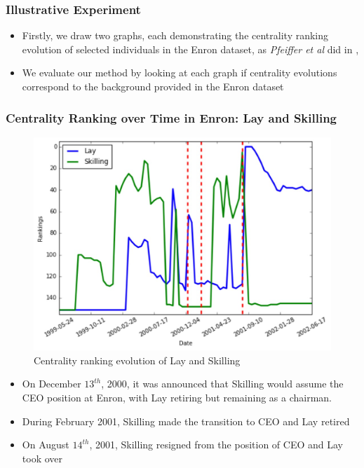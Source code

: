 \documentclass[9pt]{beamer}
\begin{document}
\begin{frame}
\frametitle{Illustrative Experiment}
\begin{itemize}
\item Firstly, we draw two graphs, each demonstrating the centrality ranking evolution of selected individuals in the Enron dataset, as \textit{Pfeiffer et al} did in \cite{pfeiffer2010probabilistic}, \cite{pfeiffer2011methods}

\item We evaluate our method by looking at each graph if centrality evolutions correspond to the background provided in the Enron dataset


\end{itemize}
\end{frame}

\begin{frame}
\frametitle{Centrality Ranking over Time in Enron: Lay and Skilling}
\begin{figure}[H]
\centering
\includegraphics[scale = 0.3]{rank_change1.png}
\caption{Centrality ranking evolution of Lay and Skilling}
\end{figure}
\vspace{-0.15in}
\begin{itemize}
\item On December $13^{th}$, 2000, it was announced that Skilling would assume the CEO position at Enron, with Lay retiring but remaining as a chairman.
\item During February 2001, Skilling made the transition to CEO and Lay retired
\item On August $14^{th}$, 2001, Skilling resigned from the position of CEO and Lay took over
\end{itemize}
\end{frame}
\end{document}
